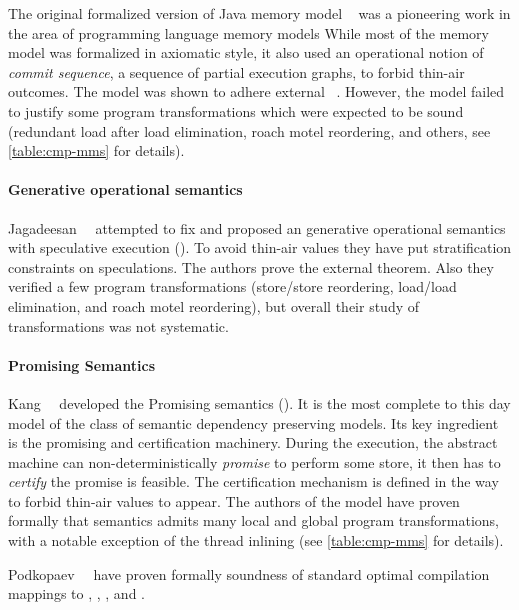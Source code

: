 The original formalized version of Java memory model \JMM~\cite{Manson-al:POPL05}
was a pioneering work in the area of programming language memory models 
While most of the memory model was formalized in axiomatic style, 
it also used an operational notion of \emph{commit sequence}, 
\ie a sequence of partial execution graphs, to forbid thin-air outcomes. 
The model was shown to adhere external \DRF~\cite{Huisman-Petri:CONCUR07}.
However, the model failed to justify some program transformations 
which were expected to be sound~\cite{Sevcik-Aspinall:ECOOP08} 
(\eg redundant load after load elimination, roach motel reordering, and others,
see \cref{table:cmp-mms} for details). 

\paragraph{Generative operational semantics}

Jagadeesan~\etal~\cite{Jagadeesan-al:ESOP10} attempted to fix \JMM 
and proposed an generative operational semantics 
with speculative execution (\GOS).
To avoid thin-air values they have put stratification constraints 
on speculations. The authors prove the external \DRF theorem. 
Also they verified a few program transformations 
(store/store reordering, load/load elimination, and roach motel reordering), 
but overall their study of transformations was not systematic.  

\paragraph{Promising Semantics}

Kang~\etal~\cite{Kang-al:POPL17, Lee-al:PLDI20} developed 
the Promising semantics (\PRM).
It is the most complete to this day model of the class of
semantic dependency preserving models. 
Its key ingredient is the promising and certification machinery.
During the execution, the abstract machine can 
non-deterministically \emph{promise} to perform some store,
it then has to \emph{certify} the promise is feasible. 
The certification mechanism is defined in the way to forbid thin-air values to appear.
The authors of the model have proven formally 
that \Promising semantics admits many local and global program transformations,
with a notable exception of the thread inlining
(see \cref{table:cmp-mms} for details).

Podkopaev~\etal~\cite{Podkopaev-al:ECOOP17, Podkopaev-al:POPL19} have proven formally
soundness of standard optimal compilation mappings to \Intel, , , and \POWER.


